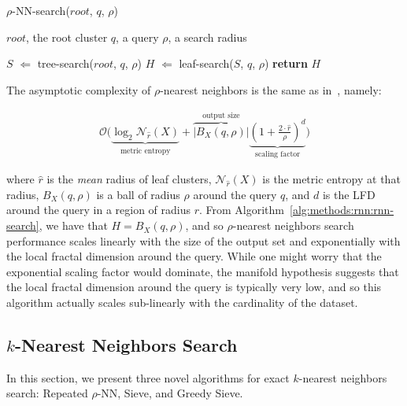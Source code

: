 \begin{algorithm} 
    \caption{$\rho$-NN-search($root$, $q$, $\rho$)} 
    \label{alg:methods:rnn:rnn-search} 
    \begin{algorithmic}
        \REQUIRE $root$, the root cluster
        \REQUIRE $q$, a query
        \REQUIRE $\rho$, a search radius

        \STATE $S$ $\Leftarrow$ tree-search($root$, $q$, $\rho$)
        \STATE $H$ $\Leftarrow$ leaf-search($S$, $q$, $\rho$)
        \STATE \textbf{return} $H$
    \end{algorithmic}
\end{algorithm}

The asymptotic complexity of $\rho$-nearest neighbors is the same as in~\cite{ishaq2019clustered}, namely:

\begin{gather}
    \mathcal{O}
    \Bigg(
        \underbrace{\log_2 \mathcal{N}_{\hat{r}}(X)}_{\textrm{metric entropy}} +
        \overbrace{ \left| B_X(q, \rho) \right|}^{\textrm{output size}}
        \underbrace{ \left( 1 + \frac{2 \cdot \hat{r}}{ \rho} \right) ^ d}_{\textrm{scaling factor}}
    \Bigg)
    \label{eq:methods:rnn:complexity}
\end{gather}

where $\hat{r}$ is the \textit{mean} radius of leaf clusters, $\mathcal{N}_{\hat{r}}(X)$ is the metric entropy at that radius, $B_X(q, \rho)$ is a ball of radius $\rho$ around the query $q$, and $d$ is the LFD around the query in a region of radius $r$.
From Algorithm~\ref{alg:methods:rnn:rnn-search}, we have that $H = B_X(q, \rho)$, and so $\rho$-nearest neighbors search performance scales linearly with the size of the output set and exponentially with the local fractal dimension around the query.
While one might worry that the exponential scaling factor would dominate, the manifold hypothesis suggests that the local fractal dimension around the query is typically very low, and so this algorithm actually scales sub-linearly with the cardinality of the dataset.


\subsection{\texorpdfstring{$k$}{k}-Nearest Neighbors Search}
\label{subsec:methods:knn-search}

In this section, we present three novel algorithms for exact $k$-nearest neighbors search:
Repeated $\rho$-NN, Sieve, and Greedy Sieve.

